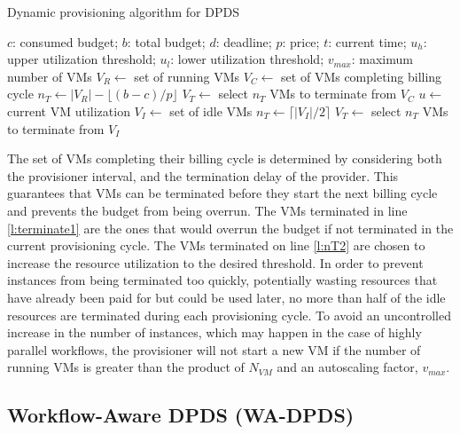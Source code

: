 \documentclass{sig-alternate}
\begin{document}
\begin{algorithm}
\caption{Dynamic provisioning algorithm for DPDS}
\label{alg:prov}
\begin{algorithmic}[1]
\Require $c$: consumed budget; $b$: total budget; $d$: deadline; $p$: price;
$t$: current time; $u_h$: upper utilization threshold; $u_l$: lower utilization
threshold; $v_{max}$: maximum number of VMs
	\State $V_R\gets$ set of running VMs
    \State $V_C\gets$ set of VMs completing billing cycle
    	\State $n_T\gets |V_R| - \lfloor(b-c)/p\rfloor$
    	\State $V_T\gets$ select $n_T$ VMs to terminate from $V_C$
    	\State {} \label{l:terminate1}
    \Else 
		\State $u\gets$ current VM utilization
    		\State {}
    		\State $V_I\gets$ set of idle VMs
    		\State $n_T\gets \lceil|V_I|/2\rceil$ \label{l:nT2}
			\State $V_T\gets$ select $n_T$ VMs to terminate from $V_I$
    		\State {} \label{l:terminate2}
    	\EndIf 
    \EndIf
\EndProcedure
\end{algorithmic} 
\end{algorithm}

The set of VMs completing their billing cycle is determined by considering both the
provisioner interval, and the termination delay of the provider. This guarantees 
that VMs can be terminated before they start the next billing cycle and prevents the
budget from being overrun. The VMs terminated in line \ref{l:terminate1} are the ones 
that would overrun the budget if not terminated in the current provisioning cycle. 
The VMs terminated on line \ref{l:nT2} are chosen to increase the resource utilization
to the desired threshold. In order to prevent instances from being
terminated too quickly, potentially wasting resources that have already been paid for
but could be used later, no more than half of the idle resources are terminated during
each provisioning cycle. To avoid an uncontrolled increase in the number of
instances, which may happen in the case of highly parallel workflows, the provisioner 
will not start a new VM if the number of running VMs is greater than the product of
$N_{VM}$ and an autoscaling factor, $v_{max}$.


\subsection{Workflow-Aware DPDS (WA-DPDS)}
\end{document}
